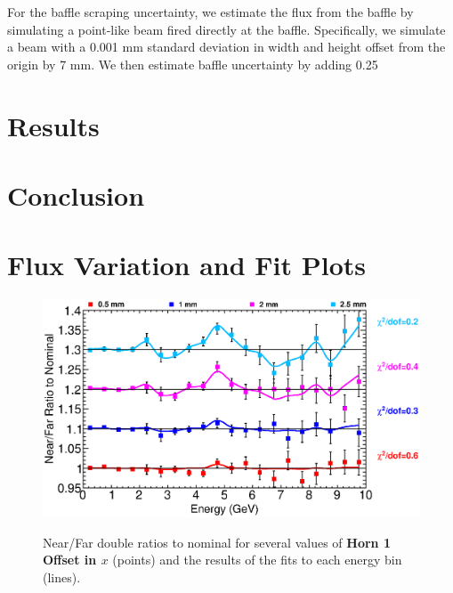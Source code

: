 For the baffle scraping uncertainty, we estimate the flux from the baffle by simulating a point-like beam fired directly at the baffle. Specifically, we simulate a beam with a 0.001 mm standard deviation in width and height offset from the origin by 7 mm.  We then estimate baffle uncertainty by adding 0.25%

\section{Results}
\label{sec:results}

\section{Conclusion}

\appendix
\section{Flux Variation and Fit Plots}
\label{app:plots}

\vspace{3in}


\begin{figure}[ht]
  \begin{center}
    {\includegraphics[width=6.0in]{figures/Horn1XOffset_nof_summary.eps}}
  \end{center}
\caption{ Near/Far double ratios to nominal for several values of {\bf Horn 1 Offset in $x$} (points) and the results of the fits to each energy bin (lines).}
\end{figure}

